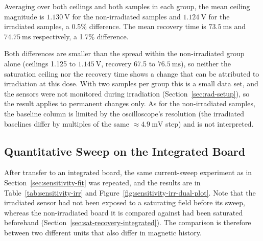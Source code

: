 \documentclass[12pt,a4paper]{article}
\begin{document}
Averaging over both ceilings and both samples in each group, the mean ceiling magnitude is $\SI{1.130}{\volt}$ for the non-irradiated samples and $\SI{1.124}{\volt}$ for the irradiated samples, a 0.5\% difference. The mean recovery time is $\SI{73.5}{\milli\second}$ and $\SI{74.75}{\milli\second}$ respectively, a 1.7\% difference.

Both differences are smaller than the spread within the non-irradiated group alone (ceilings 1.125 to $\SI{1.145}{\volt}$, recovery 67.5 to $\SI{76.5}{\milli\second}$), so neither the saturation ceiling nor the recovery time shows a change that can be attributed to irradiation at this dose. With two samples per group this is a small data set, and the sensors were not monitored during irradiation (Section~\ref{sec:rad-setup}), so the result applies to permanent changes only. As for the non-irradiated samples, the baseline column is limited by the oscilloscope's resolution (the irradiated baselines differ by multiples of the same $\approx\SI{4.9}{\milli\volt}$ step) and is not interpreted.


\subsection{Quantitative Sweep on the Integrated Board}
\label{sec:rad-sweep}

After transfer to an integrated board, the same current-sweep experiment as in Section~\ref{sec:sensitivity-fit} was repeated, and the results are in Table~\ref{tab:sensitivity-irr} and Figure~\ref{fig:sensitivity-irr-dual-plot}. Note that the irradiated sensor had not been exposed to a saturating field before its sweep, whereas the non-irradiated board it is compared against had been saturated beforehand (Section~\ref{sec:sat-recovery-integrated}). The comparison is therefore between two different units that also differ in magnetic history.
\end{document}

